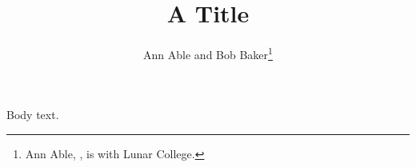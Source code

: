 \documentclass[journal]{IEEEtran}
\begin{document}
\title{A Title}
\author{Ann Able and Bob Baker\thanks{Ann Able, , is with Lunar College.}}
\maketitle
Body text.
\end{document}
